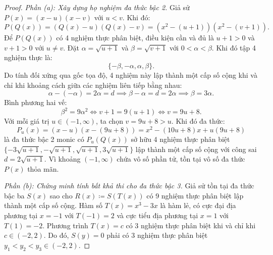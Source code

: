 \documentclass{article}
\begin{document}
\begin{proof}
\emph{Phần (a): Xây dựng họ nghiệm đa thức bậc 2.}
Giả sử $P(x) = (x - u)(x - v)$ với $u < v$. Khi đó:
\begin{equation}
    P(Q(x)) = (Q(x) - u)(Q(x) - v) = (x^2 - (u + 1))(x^2 - (v + 1)).
\end{equation}
Để $P(Q(x))$ có 4 nghiệm thực phân biệt, điều kiện cần và đủ là $u + 1 > 0$ và $v + 1 > 0$ với $u \ne v$.
Đặt $\alpha = \sqrt{u + 1}$ và $\beta = \sqrt{v + 1}$ với $0 < \alpha < \beta$. Khi đó tập 4 nghiệm thực là:
\begin{equation}
    \{-\beta, -\alpha, \alpha, \beta\}.
\end{equation}
Do tính đối xứng qua gốc tọa độ, 4 nghiệm này lập thành một cấp số cộng khi và chỉ khi khoảng cách giữa các nghiệm liên tiếp bằng nhau:
\begin{equation}
    \alpha - (-\alpha) = 2\alpha = d \implies \beta - \alpha = d = 2\alpha \implies \beta = 3\alpha.
\end{equation}
Bình phương hai vế:
\begin{equation}
    \beta^2 = 9\alpha^2 \iff v + 1 = 9(u + 1) \iff v = 9u + 8.
\end{equation}
Với mỗi giá trị $u \in (-1, \infty)$, ta chọn $v = 9u + 8 > u$. Khi đó đa thức:
\begin{equation}
    P_u(x) = (x - u)(x - (9u + 8)) = x^2 - (10u + 8)x + u(9u + 8)
\end{equation}
là đa thức bậc 2 monic có $P_u(Q(x))$ sở hữu 4 nghiệm thực phân biệt $\{-3\sqrt{u+1}, -\sqrt{u+1}, \sqrt{u+1}, 3\sqrt{u+1}\}$ lập thành một cấp số cộng với công sai $d = 2\sqrt{u+1}$. Vì khoảng $(-1, \infty)$ chứa vô số phần tử, tồn tại vô số đa thức $P(x)$ thỏa mãn.

\emph{Phần (b): Chứng minh tính bất khả thi cho đa thức bậc 3.}
Giả sử tồn tại đa thức bậc ba $S(x)$ sao cho $R(x) \coloneqq S(T(x))$ có 9 nghiệm thực phân biệt lập thành một cấp số cộng.
Hàm số $T(x) = x^3 - 3x$ là hàm lẻ, có cực đại địa phương tại $x = -1$ với $T(-1) = 2$ và cực tiểu địa phương tại $x = 1$ với $T(1) = -2$.
Phương trình $T(x) = c$ có 3 nghiệm thực phân biệt khi và chỉ khi $c \in (-2, 2)$. Do đó, $S(y) = 0$ phải có 3 nghiệm thực phân biệt $y_1 < y_2 < y_3 \in (-2, 2)$.


\end{proof}
\end{document}
